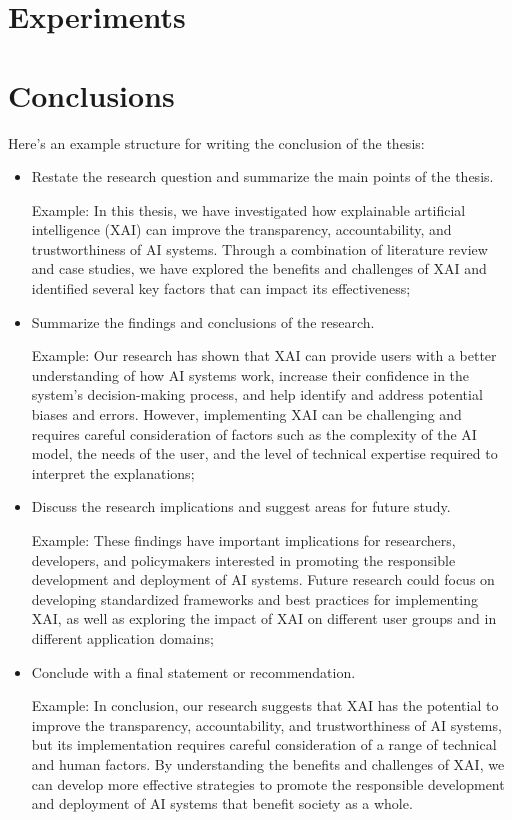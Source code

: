 \documentclass[11pt]{report} %
\begin{document}
\chapter{Experiments}


\chapter{Conclusions}
Here's an example structure for writing the conclusion of the thesis:

\begin{itemize}
    \item Restate the research question and summarize the main points of the thesis.

          Example: In this thesis, we have investigated how explainable artificial intelligence (XAI) can improve the transparency, accountability, and trustworthiness of AI systems. Through a combination of literature review and case studies, we have explored the benefits and challenges of XAI and identified several key factors that can impact its effectiveness;
    \item Summarize the findings and conclusions of the research.

          Example: Our research has shown that XAI can provide users with a better understanding of how AI systems work, increase their confidence in the system's decision-making process, and help identify and address potential biases and errors. However, implementing XAI can be challenging and requires careful consideration of factors such as the complexity of the AI model, the needs of the user, and the level of technical expertise required to interpret the explanations;

    \item Discuss the research implications and suggest areas for future study.

          Example: These findings have important implications for researchers, developers, and policymakers interested in promoting the responsible development and deployment of AI systems. Future research could focus on developing standardized frameworks and best practices for implementing XAI, as well as exploring the impact of XAI on different user groups and in different application domains;

    \item Conclude with a final statement or recommendation.

          Example: In conclusion, our research suggests that XAI has the potential to improve the transparency, accountability, and trustworthiness of AI systems, but its implementation requires careful consideration of a range of technical and human factors. By understanding the benefits and challenges of XAI, we can develop more effective strategies to promote the responsible development and deployment of AI systems that benefit society as a whole.
\end{itemize}



\end{document}
